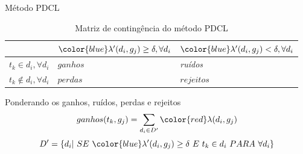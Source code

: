 \documentclass[brazil]{beamer}
\begin{document}
\begin{frame}{Método PDCL}
  \begin{table}[!htp]
    \centering
    \begin{tabular}{ |p{2cm}|p{3cm}|p{3cm}|}
      \cline{2-3}
      \multicolumn{1}{p{2cm}|}{} & ${\color{blue}\lambda'(d_i,g_j)} \geq \delta, \forall d_i$ &
      ${\color{blue}\lambda'(d_i,g_j)} < \delta, \forall d_i$ \\
      \hline
      $t_k \in d_i, \forall d_i$ & \parbox[c]{2cm}{\centering $ganhos$} &
      \parbox[c]{2cm}{\centering \it ruídos\/} \\
      \hline
      $t_k \not\in d_i, \forall d_i$ & \parbox[c]{2cm}{\centering $perdas$} &
      \parbox[c]{2cm}{\centering $rejeitos$} \\
      \hline
    \end{tabular}
    \caption{Matriz de contingência do método PDCL}
    \label{table:softmatrix}
  \end{table}
  \begin{alertblock}{Ponderando os ganhos, ruídos, perdas e rejeitos}
    \begin{equation}
      ganhos(t_k,g_j) = 
      \sum_{ d_i \in D' } {\color{red}\lambda(d_i,g_j)}
    \end{equation}
    \begin{equation}
      D' = \{ d_i | \ SE\ {\color{blue}\lambda'(d_i,g_j)} \geq \delta\ E\ t_k \in d_i\ PARA\ \forall
      d_i \}
    \end{equation}
  \end{alertblock}

\end{frame}
\end{document}
